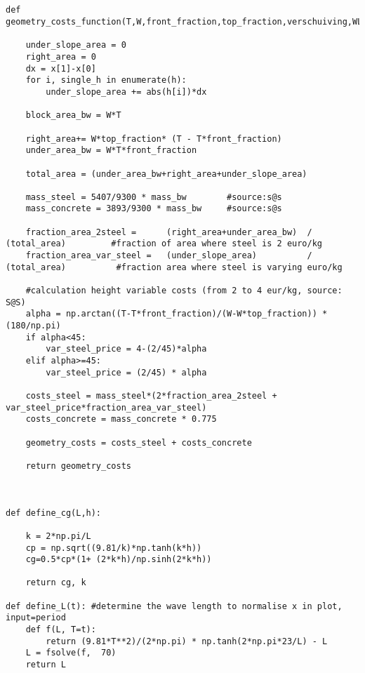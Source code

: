 \begin{mdframed}[backgroundcolor=light-gray, roundcorner=10pt,leftmargin=1, rightmargin=1, innerleftmargin=0, innertopmargin=7,innerbottommargin=0, outerlinewidth=1, linecolor=light-gray]
\begin{lstlisting}[linewidth=\columnwidth,caption=Functions used in setting up simulations ., label=script:setting up simulations]

    
def geometry_costs_function(T,W,front_fraction,top_fraction,verschuiving,WL,mass_bw,h,x):

    under_slope_area = 0
    right_area = 0
    dx = x[1]-x[0]
    for i, single_h in enumerate(h):
        under_slope_area += abs(h[i])*dx

    block_area_bw = W*T

    right_area+= W*top_fraction* (T - T*front_fraction)
    under_area_bw = W*T*front_fraction

    total_area = (under_area_bw+right_area+under_slope_area)

    mass_steel = 5407/9300 * mass_bw        #source:s@s
    mass_concrete = 3893/9300 * mass_bw     #source:s@s

    fraction_area_2steel =      (right_area+under_area_bw)  / (total_area)         #fraction of area where steel is 2 euro/kg
    fraction_area_var_steel =   (under_slope_area)          / (total_area)          #fraction area where steel is varying euro/kg

    #calculation height variable costs (from 2 to 4 eur/kg, source: S@S)
    alpha = np.arctan((T-T*front_fraction)/(W-W*top_fraction)) * (180/np.pi)
    if alpha<45:
        var_steel_price = 4-(2/45)*alpha
    elif alpha>=45:
        var_steel_price = (2/45) * alpha

    costs_steel = mass_steel*(2*fraction_area_2steel + var_steel_price*fraction_area_var_steel)
    costs_concrete = mass_concrete * 0.775

    geometry_costs = costs_steel + costs_concrete

    return geometry_costs



def define_cg(L,h):

    k = 2*np.pi/L
    cp = np.sqrt((9.81/k)*np.tanh(k*h))
    cg=0.5*cp*(1+ (2*k*h)/np.sinh(2*k*h))

    return cg, k

def define_L(t): #determine the wave length to normalise x in plot, input=period
    def f(L, T=t):
        return (9.81*T**2)/(2*np.pi) * np.tanh(2*np.pi*23/L) - L
    L = fsolve(f,  70)
    return L
    
\end{lstlisting}
\end{mdframed}

